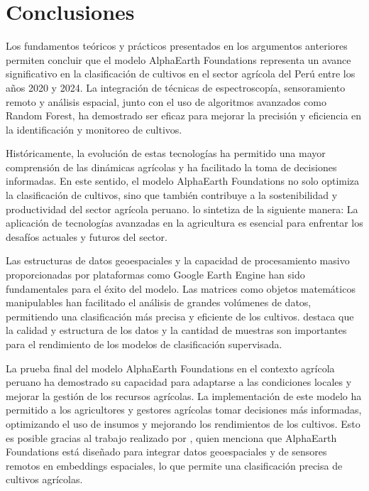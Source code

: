 \section{Conclusiones}

Los fundamentos teóricos y prácticos presentados en los argumentos anteriores permiten concluir que el modelo AlphaEarth Foundations representa un avance significativo en la clasificación de cultivos en el sector agrícola del Perú entre los años 2020 y 2024. La integración de técnicas de espectroscopía, sensoramiento remoto y análisis espacial, junto con el uso de algoritmos avanzados como Random Forest, ha demostrado ser eficaz para mejorar la precisión y eficiencia en la identificación y monitoreo de cultivos.

Históricamente, la evolución de estas tecnologías ha permitido una mayor comprensión de las dinámicas agrícolas y ha facilitado la toma de decisiones informadas. En este sentido, el modelo AlphaEarth Foundations no solo optimiza la clasificación de cultivos, sino que también contribuye a la sostenibilidad y productividad del sector agrícola peruano. \cite{En2009} lo sintetiza de la siguiente manera: \textcolor{verde}{La aplicación de tecnologías avanzadas en la agricultura es esencial para enfrentar los desafíos actuales y futuros del sector.}

Las estructuras de datos geoespaciales y la capacidad de procesamiento masivo proporcionadas por plataformas como Google Earth Engine han sido fundamentales para el éxito del modelo. Las matrices como objetos matemáticos manipulables han facilitado el análisis de grandes volúmenes de datos, permitiendo una clasificación más precisa y eficiente de los cultivos. \cite{Breiman2001} destaca que \textcolor{verde}{la calidad y estructura de los datos y la cantidad de muestras son importantes para el rendimiento de los modelos de clasificación supervisada.}

La prueba final del modelo AlphaEarth Foundations en el contexto agrícola peruano ha demostrado su capacidad para adaptarse a las condiciones locales y mejorar la gestión de los recursos agrícolas. La implementación de este modelo ha permitido a los agricultores y gestores agrícolas tomar decisiones más informadas, optimizando el uso de insumos y mejorando los rendimientos de los cultivos. Esto es posible gracias al trabajo realizado por \cite{Brown2025}, quien menciona que \textcolor{verde}{AlphaEarth Foundations está diseñado para integrar datos geoespaciales y de sensores remotos en embeddings espaciales, lo que permite una clasificación precisa de cultivos agrícolas.}

